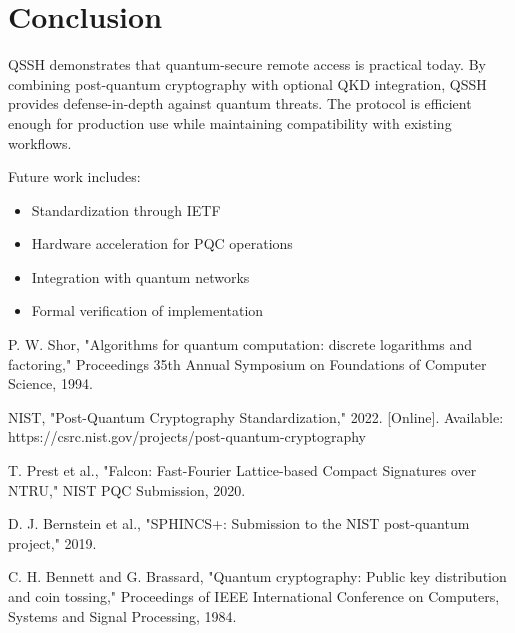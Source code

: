 \documentclass[11pt,a4paper]{article}
\begin{document}
\section{Conclusion}

QSSH demonstrates that quantum-secure remote access is practical today. By combining post-quantum cryptography with optional QKD integration, QSSH provides defense-in-depth against quantum threats. The protocol is efficient enough for production use while maintaining compatibility with existing workflows.

Future work includes:
\begin{itemize}
    \item Standardization through IETF
    \item Hardware acceleration for PQC operations  
    \item Integration with quantum networks
    \item Formal verification of implementation
\end{itemize}


\begin{thebibliography}{9}

P. W. Shor, "Algorithms for quantum computation: discrete logarithms and factoring," Proceedings 35th Annual Symposium on Foundations of Computer Science, 1994.

NIST, "Post-Quantum Cryptography Standardization," 2022. [Online]. Available: https://csrc.nist.gov/projects/post-quantum-cryptography

T. Prest et al., "Falcon: Fast-Fourier Lattice-based Compact Signatures over NTRU," NIST PQC Submission, 2020.

D. J. Bernstein et al., "SPHINCS+: Submission to the NIST post-quantum project," 2019.

C. H. Bennett and G. Brassard, "Quantum cryptography: Public key distribution and coin tossing," Proceedings of IEEE International Conference on Computers, Systems and Signal Processing, 1984.

\end{thebibliography}
\end{document}
